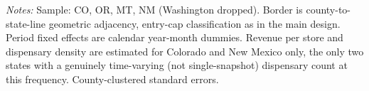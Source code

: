 \begin{table}[htbp]
\centering
\caption{Main pooled specification, monthly panel, Washington dropped}
\label{tab:main_pooled_monthly_noWA}
\footnotesize
{}
\begin{minipage}{0.98\textwidth}
\vspace{0.3em}
\footnotesize
\textit{Notes:} Sample: CO, OR, MT, NM (Washington dropped). Border is county-to-state-line geometric
adjacency, entry-cap classification as in the main design. Period fixed effects are calendar year-month dummies. Revenue per store and dispensary density are estimated for Colorado and New Mexico only, the
only two states with a genuinely time-varying (not single-snapshot) dispensary count at this frequency.
County-clustered standard errors.
\end{minipage}
\end{table}
